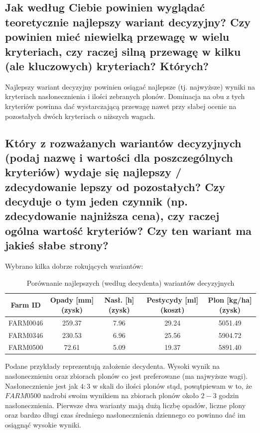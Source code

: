 \documentclass[11pt]{article}
\begin{document}
\subsection{Jak według Ciebie powinien wyglądać teoretycznie najlepszy wariant decyzyjny? Czy powinien mieć niewielką przewagę w wielu kryteriach, czy raczej silną przewagę w kilku (ale kluczowych) kryteriach? Których?}
Najlepszy wariant decyzyjny powinien osiągać najlepsze (tj. najwyższe) wyniki na kryteriach nasłonecznienia i ilości zebranych plonów. Dominacja na obu z tych kryteriów powinna dać wystarczającą przewagę nawet przy słabej ocenie na pozostałych dwóch kryteriach o niższych wagach.

\subsection{Który z rozważanych wariantów decyzyjnych (podaj nazwę i wartości dla poszczególnych kryteriów) wydaje się najlepszy / zdecydowanie lepszy od pozostałych? Czy decyduje o tym jeden czynnik (np. zdecydowanie najniższa cena), czy raczej ogólna wartość kryteriów? Czy ten wariant ma jakieś słabe strony?}
Wybrano kilka dobrze rokujących wariantów:
\begin{table}[H]
\centering
\begin{tabular}{|c||c|c|c|c|}
\hline
\textbf{Farm ID} & \textbf{Opady [mm] (zysk)} & \textbf{Nasł. [h] (zysk)} & \textbf{Pestycydy [ml] (koszt)} & \textbf{Plon [kg/ha] (zysk)} \\
\hline
FARM0046 & 259.37 & 7.96 & 29.24 & 5051.49 \\
\hline
FARM0346 & 230.53 & 6.96 & 25.56 & 5904.72 \\
\hline
FARM0500 & 72.61 & 5.09 & 19.37 & 5891.40 \\
\hline
\end{tabular}
\caption{Porównanie najlepszych (według decydenta) wariantów decyzyjnych}
\end{table}

Podane przykłady reprezentują założenie decydenta. Wysoki wynik na nasłonecznieniu oraz zbiorach plonów co jest preferowane (ma najwyższe wagi). Nasłonecznienie jest jak $4:3$ w skali do ilości plonów stąd, powątpiewam w to, że $FARM0500$ nadrobi swoim wynikiem na zbiorach plonów około $2-3$ godzin nasłonecznienia. Pierwsze dwa warianty mają dużą liczbę opadów, liczne plony oraz bardzo długi czas średniego nasłonecznienia dziennego co powinno dać im osiągnąć wysokie wyniki.
\end{document}
